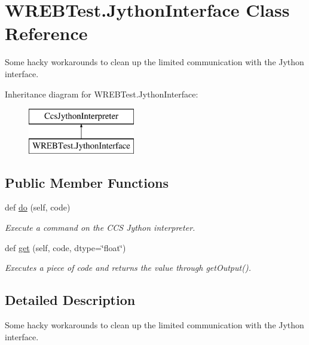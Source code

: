 \hypertarget{class_w_r_e_b_test_1_1_jython_interface}{}\section{W\+R\+E\+B\+Test.\+Jython\+Interface Class Reference}
\label{class_w_r_e_b_test_1_1_jython_interface}


Some hacky workarounds to clean up the limited communication with the Jython interface.  


Inheritance diagram for W\+R\+E\+B\+Test.\+Jython\+Interface\+:\begin{figure}[H]
\begin{center}
\leavevmode
\includegraphics[height=2.000000cm]{class_w_r_e_b_test_1_1_jython_interface}
\end{center}
\end{figure}
\subsection*{Public Member Functions}
\begin{DoxyCompactItemize}
\item 
def \hyperlink{class_w_r_e_b_test_1_1_jython_interface_aaff9cae5e3c5367b1c79f8be5f087181}{do} (self, code)
\begin{DoxyCompactList}\small\item\em Execute a command on the C\+CS Jython interpreter. \end{DoxyCompactList}\item 
def \hyperlink{class_w_r_e_b_test_1_1_jython_interface_a0c3b2841fae79791193be63ac323b46a}{get} (self, code, dtype=\char`\"{}float\char`\"{})
\begin{DoxyCompactList}\small\item\em Executes a piece of code and returns the value through get\+Output(). \end{DoxyCompactList}\end{DoxyCompactItemize}


\subsection{Detailed Description}
Some hacky workarounds to clean up the limited communication with the Jython interface. 



